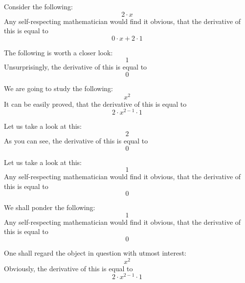 \documentclass{article}
\begin{document}
Consider the following:
\begin{equation}
2 \cdot x 
\end{equation}
Any self-respecting mathematician would find it obvious, that the derivative of this is equal to
\begin{equation}
0 \cdot x + 2 \cdot 1 
\end{equation}

The following is worth a closer look:
\begin{equation}
1 
\end{equation}
Unsurprisingly, the derivative of this is equal to
\begin{equation}
0 
\end{equation}

We are going to study the following:
\begin{equation}
x ^{2 } 
\end{equation}
It can be easily proved, that the derivative of this is equal to
\begin{equation}
2 \cdot x ^{2 - 1 } \cdot 1 
\end{equation}

Let us take a look at this:
\begin{equation}
2 
\end{equation}
As you can see, the derivative of this is equal to
\begin{equation}
0 
\end{equation}

Let us take a look at this:
\begin{equation}
1 
\end{equation}
Any self-respecting mathematician would find it obvious, that the derivative of this is equal to
\begin{equation}
0 
\end{equation}

We shall ponder the following:
\begin{equation}
1 
\end{equation}
Any self-respecting mathematician would find it obvious, that the derivative of this is equal to
\begin{equation}
0 
\end{equation}

One shall regard the object in question with utmost interest:
\begin{equation}
x ^{2 } 
\end{equation}
Obviously, the derivative of this is equal to
\begin{equation}
2 \cdot x ^{2 - 1 } \cdot 1 
\end{equation}
\end{document}

